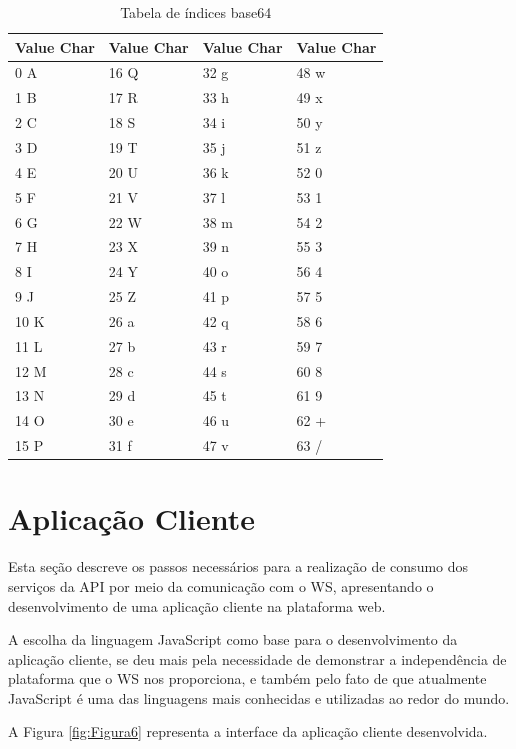 \documentclass[12pt]{article}
\begin{document}
\begin{table}[ht]
	\centering
	\caption{Tabela de índices base64}
	\label{tab:Table5}
	\smallskip
	\begin{tabular}{ |l|l|l|l| }
		\hline
		Value Char&Value Char&Value Char&Value Char \\ \hline
		0	A&	16	Q&	32	g&	48	w \\ \hline
		1	B&	17	R&	33	h&	49	x \\ \hline
		2	C&	18	S&	34	i&	50	y \\ \hline
		3	D&	19	T&	35	j&	51	z \\ \hline
		4	E&	20	U&	36	k&	52	0 \\ \hline
		5	F&	21	V&	37	l&	53	1 \\ \hline
		6	G&	22	W&	38	m&	54	2 \\ \hline
		7	H&	23	X&	39	n&	55	3 \\ \hline
		8	I&	24	Y&	40	o&	56	4 \\ \hline
		9	J&	25	Z&	41	p&	57	5 \\ \hline
		10	K&	26	a&	42	q&	58	6 \\ \hline
		11	L&	27	b&	43	r&	59	7 \\ \hline
		12	M&	28	c&	44	s&	60	8 \\ \hline
		13	N&	29	d&	45	t&	61	9 \\ \hline
		14	O&	30	e&	46	u&	62	+ \\ \hline
		15	P&	31	f&	47	v&	63	/ \\ \hline
	\end{tabular}
\end{table}

\section{Aplicação Cliente}

Esta seção descreve os passos necessários para a realização de consumo dos serviços da API por meio da comunicação com o WS, apresentando o desenvolvimento de uma aplicação cliente na plataforma web.

A escolha da linguagem JavaScript como base para o desenvolvimento da aplicação cliente, se deu mais pela necessidade de demonstrar a independência de plataforma que o WS nos proporciona, e também pelo fato de que atualmente JavaScript é uma das linguagens mais conhecidas e utilizadas ao redor do mundo.

A Figura \ref{fig:Figura6} representa a interface da aplicação cliente desenvolvida.
\end{document}

